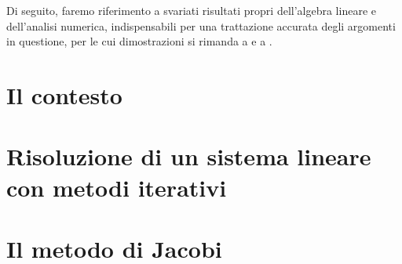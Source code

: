 \documentclass[
	a4paper,
	twoside,
	12pt
]{book}
\theoremstyle{teorema}
\theoremstyle{stileEsempio}
\begin{document}
Di seguito, faremo riferimento a svariati risultati propri dell'algebra lineare e dell'analisi numerica, indispensabili per una trattazione accurata degli 
argomenti in questione, per le cui dimostrazioni si rimanda a \cite{Betti2000} e a \cite{Quarteroni2000}.
\section{Il contesto}

\section{Risoluzione di un sistema lineare con metodi iterativi}

\section{Il metodo di Jacobi}

\backmatter

%
\printbibliography
{}
%
\end{document}
